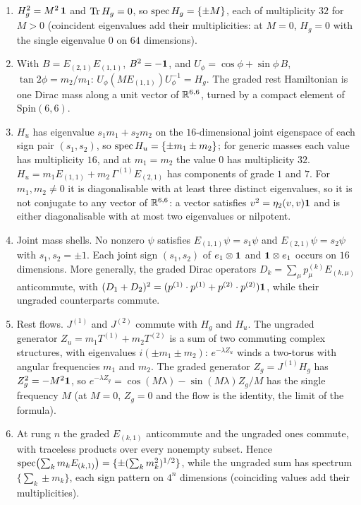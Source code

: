 \begin{proposition}
\label{e1:prop:rest}
\begin{enumerate}[label=(\roman*),leftmargin=2.2em]
\item $H_g^2=M^2\,\mathbf 1$ and $\operatorname{Tr} H_g=0$, so $\operatorname{spec} H_g=\{\pm M\}$, each of multiplicity $32$ for $M>0$ (coincident eigenvalues add their
multiplicities: at $M=0$, $H_g=0$ with the single eigenvalue $0$ on $64$ dimensions).
\item With $B=E_{(2,1)}E_{(1,1)}$, $B^2=-\mathbf 1$, and $U_\phi=\cos\phi+\sin\phi\,B$, $\tan2\phi=m_2/m_1$: $U_\phi(ME_{(1,1)})U_\phi^{-1}=H_g$. The graded
rest Hamiltonian is one Dirac mass along a unit vector of $\mathbb{R}^{6,6}$, turned by a compact element of $\mathrm{Spin}(6,6)$.
\item $H_u$ has eigenvalue $s_1m_1+s_2m_2$ on the $16$-dimensional joint eigenspace of each sign pair $(s_1,s_2)$, so
$\operatorname{spec} H_u=\{\pm m_1\pm m_2\}$; for generic masses each value has multiplicity $16$, and at $m_1=m_2$ the value $0$ has multiplicity $32$.
$H_u=m_1E_{(1,1)}+m_2\,\Gamma^{(1)}E_{(2,1)}$ has components of grade $1$ and $7$. For $m_1,m_2\neq0$ it is diagonalisable with at least three
distinct eigenvalues, so it is not conjugate to any vector of $\mathbb{R}^{6,6}$: a vector satisfies $v^2=\eta_2(v,v)\mathbf 1$ and is either
diagonalisable with at most two eigenvalues or nilpotent.
\item Joint mass shells. No nonzero $\psi$ satisfies $E_{(1,1)}\psi=s_1\psi$ and $E_{(2,1)}\psi=s_2\psi$ with $s_1,s_2=\pm1$. Each joint sign
$(s_1,s_2)$ of $e_1\otimes\mathbf 1$ and $\mathbf 1\otimes e_1$ occurs on $16$ dimensions. More generally, the graded Dirac operators
$D_k=\sum_\mu p^{(k)}_\mu E_{(k,\mu)}$ anticommute, with $(D_1+D_2)^2=(p^{(1)}\cdot p^{(1)}+p^{(2)}\cdot p^{(2)})\mathbf 1$, while their ungraded
counterparts commute.
\item Rest flows. $J^{(1)}$ and $J^{(2)}$ commute with $H_g$ and $H_u$. The ungraded generator $Z_u=m_1T^{(1)}+m_2T^{(2)}$ is a sum of two commuting
complex structures, with eigenvalues $i(\pm m_1\pm m_2)$: $e^{-\lambda Z_u}$ winds a two-torus with angular frequencies $m_1$ and $m_2$. The
graded generator $Z_g=J^{(1)}H_g$ has $Z_g^2=-M^2\mathbf 1$, so $e^{-\lambda Z_g}=\cos(M\lambda)-\sin(M\lambda)Z_g/M$ has the single frequency $M$ (at $M=0$,
$Z_g=0$ and the flow is the identity, the limit of the formula).
\item At rung $n$ the graded $E_{(k,1)}$ anticommute and the ungraded ones commute, with traceless products over every nonempty subset. Hence
$\operatorname{spec}\bigl(\sum_km_kE_{(k,1)}\bigr)=\{\pm(\sum_km_k^2)^{1/2}\}$, while the ungraded sum has spectrum $\{\sum_k\pm m_k\}$, each sign
pattern on $4^n$ dimensions (coinciding values add their multiplicities).
\end{enumerate}
\end{proposition}

